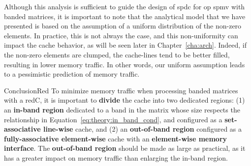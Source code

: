 Although this analysis is sufficient to guide the design of \acrlong{spdc} for \acrshort{op} \acrshort{spmv} with \gls{banded} matrices, it is important to note that the analytical model that we have presented is based on the assumption of a uniform distribution of the non-zero elements.
In practice, this is not always the case, and this non-uniformity can impact the cache behavior, as will be seen later in Chapter~\ref{cha:arch}.
Indeed, if the non-zero elements are clumped, the cache-lines tend to be better filled, resulting in lower memory traffic.
In other words, our uniform assumption leads to a pessimistic prediction of memory traffic.

\begin{highlight}{Conclusion}{Red}
    To minimize memory traffic when processing \gls{banded} matrices with a \gls{redC}, it is important to \textbf{divide} the cache into two dedicated regions: (1) an \textbf{in-\gls{band} region} dedicated to a \gls{band} in the matrix whose size respects the relationship in Equation~\ref{eq:theory:in_band_cond}, and configured as a \textbf{\gls{set}-associative line-wise} cache, and (2) an \textbf{out-of-\gls{band} region} configured as a \textbf{fully-associative element-wise} cache with an \textbf{element-wise memory interface}.
    The \textbf{out-of-\gls{band} region} should be made as large as practical, as it has a greater impact on memory traffic than enlarging the in-\gls{band} region.
\end{highlight}